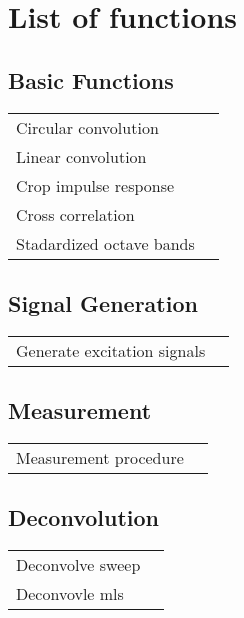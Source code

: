 
\chapter{List of functions} %
\label{cha:list_of_functions}

\section{Basic Functions} %
\label{sec:basic_functions}

\begin{tabular}{ll}
Circular convolution & \texttt{\nameref{cha:rbaCircularConv}} \\
Linear convolution &\texttt{\nameref{cha:rbaLinearConv}} \\
Crop impulse response &\texttt{\nameref{cha:rbaCropIR}} \\
Cross correlation & \texttt{\nameref{cha:rbaCrossCorr}} \\
Stadardized octave bands & \texttt{\nameref{cha:rbaGetFreqs}}	
\end{tabular}


\section{Signal Generation} %
\label{sec:signal_generation}
\begin{tabular}{ll}
Generate excitation signals &\texttt{\nameref{cha:rbaGenerateSignal}} \\
\end{tabular}


\section{Measurement} %
\label{sec:acquisition}
\begin{tabular}{ll}
Measurement procedure &\texttt{\nameref{cha:rbaMeasurement}}	
\end{tabular}


\section{Deconvolution} %
\label{sec:deconvolution}
\begin{tabular}{ll}
Deconvolve sweep &\texttt{\nameref{cha:sweepdeconv}}\\
Deconvovle mls & \texttt{\nameref{cha:mlsdeconv}}	
\end{tabular}

